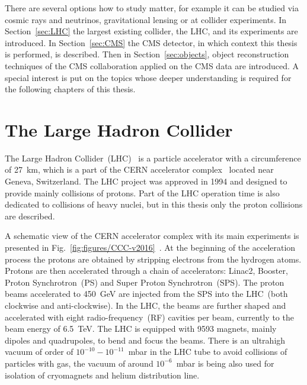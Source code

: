 \clearpage

\setcounter{secnumdepth}{4}
\setcounter{secnumdepth}{5}

There are several options how to study matter, for example it can be studied via cosmic rays and neutrinos, gravitational lensing or at collider experiments. In Section~\ref{sec:LHC} the largest existing collider, the LHC, and its experiments are introduced. In Section~\ref{sec:CMS} the CMS detector, in which context this thesis is performed, is described. Then in Section~\ref{sec:objects}, object reconstruction techniques of the CMS collaboration applied on the CMS data are introduced. A special interest is put on the topics whose deeper understanding is required for the following chapters of this thesis.

\section{The Large Hadron Collider~\label{sec:LHC}}

The Large Hadron Collider~(LHC)~\cite{CERN-Brochure-2017-002-Eng, Evans:2008zzb} is a particle accelerator with a circumference of 27~km, which is a part of the CERN accelerator complex~\cite{Bruning:2004ej} located near Geneva, Switzerland. The LHC project was approved in 1994 and designed to provide mainly collisions of protons. Part of the LHC operation time is also dedicated to collisions of heavy nuclei, but in this thesis only the proton collisions are described.

A schematic view of the CERN accelerator complex with its main experiments is presented in Fig.~\ref{fig:figures/CCC-v2016}~\cite{Mobs:2225847}. At the beginning of the acceleration process the protons are obtained by stripping electrons from the hydrogen atoms. Protons are then accelerated through a chain of accelerators: Linac2, Booster, Proton Synchrotron~(PS) and Super Proton Synchrotron~(SPS). The proton beams accelerated to 450~GeV are injected from the SPS into the LHC~(both clockwise and anti-clockwise). In the LHC, the beams are further shaped and accelerated with eight radio-frequency~(RF) cavities per beam, currently to the beam energy of 6.5~TeV. The LHC is equipped with 9593 magnets, mainly dipoles and quadrupoles, to bend and focus the beams. There is an ultrahigh vacuum of order of $10^{-10}-10^{-11}$~mbar in the LHC tube to avoid collisions of particles with gas, the vacuum of around $10^{-6}$~mbar is being also used for isolation  of cryomagnets and helium distribution line.


